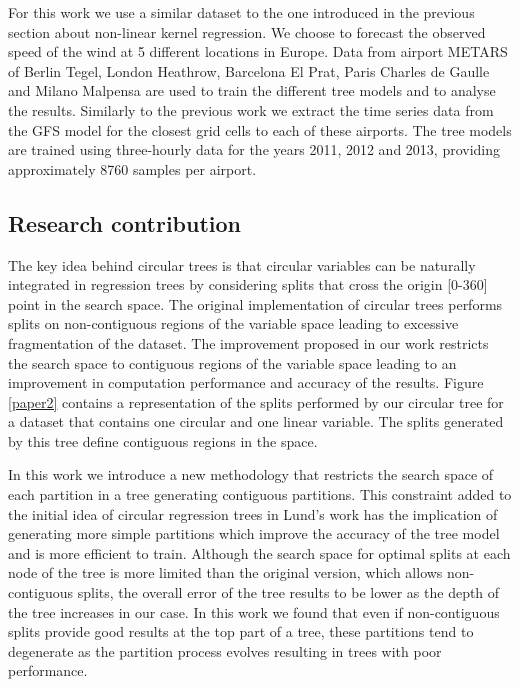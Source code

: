For this work we use a similar dataset to the one introduced in the previous section about non-linear kernel regression. We choose to forecast the observed speed of the wind at 5 different locations in Europe. Data from airport METARS of Berlin Tegel, London Heathrow, Barcelona El Prat, Paris Charles de Gaulle and Milano Malpensa are used to train the different tree models and to analyse the results. Similarly to the previous work we extract the time series data from the GFS model for the closest grid cells to each of these airports. The tree models are trained using three-hourly data for the years 2011, 2012 and 2013, providing approximately 8760 samples per airport.


\subsection{Research contribution}
The key idea behind circular trees is that circular variables can be naturally integrated in regression trees by considering splits that cross the origin [0-360] point in the search space. The original implementation of circular trees performs splits on non-contiguous regions of the variable space leading to excessive fragmentation of the dataset. The improvement proposed in our work restricts the search space to contiguous regions of the variable space leading to an improvement in computation performance and accuracy of the results. Figure \ref{paper2} contains a representation of the splits performed by our circular tree for a dataset that contains one circular and one linear variable. The splits generated by this tree define contiguous regions in the space.

\medskip

In this work we introduce a new methodology that restricts the search space of each partition in a tree generating contiguous partitions. This constraint added to the initial idea of circular regression trees in Lund's work \citep{lund2002tree} has the implication of generating more simple partitions which improve the accuracy of the tree model and is more efficient to train. Although the search space for optimal splits at each node of the tree is more limited than the original version, which allows non-contiguous splits, the overall error of the tree results to be lower as the depth of the tree increases in our case. In this work we found that even if non-contiguous splits provide good results at the top part of a tree, these partitions tend to degenerate as the partition process evolves resulting in trees with poor performance.

